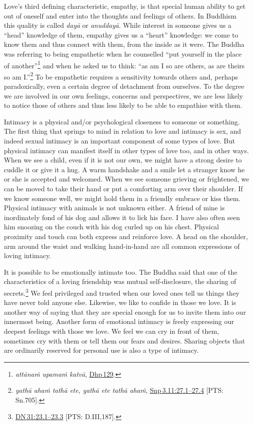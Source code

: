 \documentclass[10pt, openright]{book}
\begin{document}
Love’s third defining characteristic, empathy, is that special human ability to get out of oneself and enter into the thoughts and feelings of others. In Buddhism this quality is called \textit{dayā} or \textit{anuddayā}. While interest in someone gives us a “head” knowledge of them, empathy gives us a “heart” knowledge: we come to know them and thus connect with them, from the inside as it were. The Buddha was referring to being empathetic when he counselled “put yourself in the place of another”\footnote {\textit{attānaṁ upamaṁ katvā}, \href{https://suttacentral.net/dhp129/en/sujato}{Dhp 129}.} and when he asked us to think: “as am I so are others, as are theirs so am I.”\footnote {\textit{yathā ahaṁ tathā ete, yathā ete tathā ahaṁ}, \href{https://suttacentral.net/snp3.11/en/sujato\#27.1}{Snp 3.11:27.1–27.4} [PTS: Sn.705].} To be empathetic requires a sensitivity towards others and, perhaps paradoxically, even a certain degree of detachment from ourselves. To the degree we are involved in our own feelings, concerns and perspectives, we are less likely to notice those of others and thus less likely to be able to empathise with them.


Intimacy is a physical and/or psychological closeness to someone or something. The first thing that springs to mind in relation to love and intimacy is sex, and indeed sexual intimacy is an important component of some types of love. But physical intimacy can manifest itself in other types of love too, and in other ways. When we see a child, even if it is not our own, we might have a strong desire to cuddle it or give it a hug. A warm handshake and a smile let a stranger know he or she is accepted and welcomed. When we see someone grieving or frightened, we can be moved to take their hand or put a comforting arm over their shoulder. If we know someone well, we might hold them in a friendly embrace or kiss them. Physical intimacy with animals is not unknown either. A friend of mine is inordinately fond of his dog and allows it to lick his face. I have also often seen him snoozing on the couch with his dog curled up on his chest. Physical proximity and touch can both express and reinforce love. A head on the shoulder, arm around the waist and walking hand-in-hand are all common expressions of loving intimacy.


It is possible to be emotionally intimate too. The Buddha said that one of the characteristics of a loving friendship was mutual self-disclosure, the sharing of secrets.\footnote {\href{https://suttacentral.net/dn31/en/sujato\#23.1}{DN 31:23.1–23.3} [PTS: D.III,187].} We feel privileged and trusted when our loved ones tell us things they have never told anyone else. Likewise, we like to confide in those we love. It is another way of saying that they are special enough for us to invite them into our innermost being. Another form of emotional intimacy is freely expressing our deepest feelings with those we love. We feel we can cry in front of them, sometimes cry with them or tell them our fears and desires. Sharing objects that are ordinarily reserved for personal use is also a type of intimacy.
\end{document}
